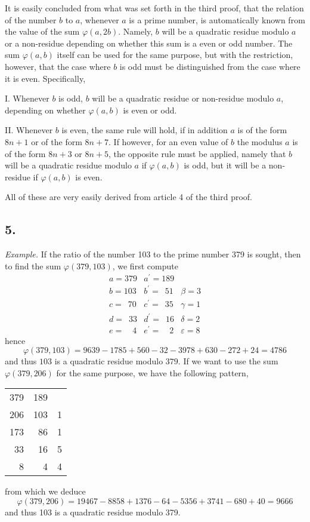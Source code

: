 \documentclass[twoside,12pt]{memoir}
\begin{document}
It is easily concluded from what was set forth in the third proof, that the relation of the number \(b\) to \(a\), whenever \(a\) is a prime number, is automatically known from the value \pagebreak%
of the sum \(\varphi(a, 2 b)\). Namely, \(b\) will be a quadratic residue modulo \(a\) or a non-residue depending on whether this sum is a even or odd number.  The sum \(\varphi(a, b)\) itself can be used for the same purpose, but with the restriction, however, that the case where \(b\) is odd must be distinguished from the case where it is even. Specifically,
 
I. Whenever \(b\) is odd, \(b\) will be a quadratic residue or non-residue modulo \(a\), depending on whether \(\varphi(a, b)\) is even or odd.
 
II. Whenever \(b\) is even, the same rule will hold, if in addition \(a\) is of the form \(8n+1\) or of the form \(8n+7\).  If however, for an even value of \(b\) the modulus \(a\) is of the form \(8n+3\) or \(8n+5\), the opposite rule must be applied, namely that \(b\) will be a quadratic residue modulo \(a\) if \(\varphi(a, b)\) is odd, but it will be a non-residue if \(\varphi(a, b)\) is even.
 
All of these are very easily derived from article 4 of the third proof.

\subsection*{5.}

\textit{Example.} If the ratio of the number 103 to the prime number 379 is sought, then to find the sum \(\varphi(379,103)\), we first compute
\[\begin{array}{r|r|r}
a= 379 & a^{\prime}=189 & \\
b= 103 & b^{\prime}=\phantom{0}51 & \beta=3 \\
c= \phantom{0}70 & c^{\prime}=\phantom{0}35 & \gamma=1 \\
d= \phantom{0}33 & d^{\prime}=\phantom{0}16 & \delta=2 \\
e= \phantom{00}4 & e^{\prime}=\phantom{00}2 & \varepsilon=8
\end{array}\]
hence
\[\varphi(379,103)=9639-1785+560-32-3978+630-272+24=4786\]
and thus \(103\) is a quadratic residue modulo \(379\). If we want to use the sum \(\varphi(379,206)\) for the same purpose, we have the following pattern,
\begin{center}
\begin{tabular}{r|r|r}
379 & 189 &  \\
206 & 103 & 1 \\
173 & 86 & 1 \\
33 & 16 & 5 \\
8 & 4 & 4 \\
\end{tabular}
\end{center}
from which we deduce\pagebreak%
\[\varphi(379,206)=19467-8858+1376-64-5356+3741-680+40=9666\]
and thus 103 is a quadratic residue modulo 379.
\end{document}
